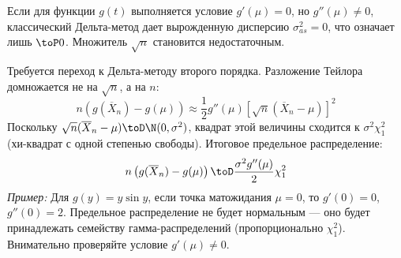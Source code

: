 \begin{WarningBox}
Если для функции $g(t)$ выполняется условие $g'(\mu) = 0$, но $g''(\mu) \neq 0$, классический Дельта-метод дает вырожденную дисперсию $\sigma^2_{as} = 0$, что означает лишь $\toP 0$. Множитель $\sqrt{n}$ становится недостаточным. 

Требуется переход к Дельта-методу второго порядка. Разложение Тейлора домножается не на $\sqrt{n}$, а на $n$:
\[
    n \left( g(\overline{X}_n) - g(\mu) \right) \approx \frac{1}{2} g''(\mu) \left[ \sqrt{n}(\overline{X}_n - \mu) \right]^2
\]
Поскольку $\sqrt{n}(\overline{X}_n - \mu) \toD \N(0, \sigma^2)$, квадрат этой величины сходится к $\sigma^2 \chi^2_1$ (хи-квадрат с одной степенью свободы). Итоговое предельное распределение:
\[
    n \left( g(\overline{X}_n) - g(\mu) \right) \toD \frac{\sigma^2 g''(\mu)}{2} \chi^2_1
\]
\textit{Пример:} Для $g(y) = y \sin y$, если точка матожидания $\mu = 0$, то $g'(0) = 0$, $g''(0) = 2$. Предельное распределение не будет нормальным — оно будет принадлежать семейству гамма-распределений (пропорционально $\chi^2_1$). Внимательно проверяйте условие $g'(\mu) \neq 0$.
\end{WarningBox}
